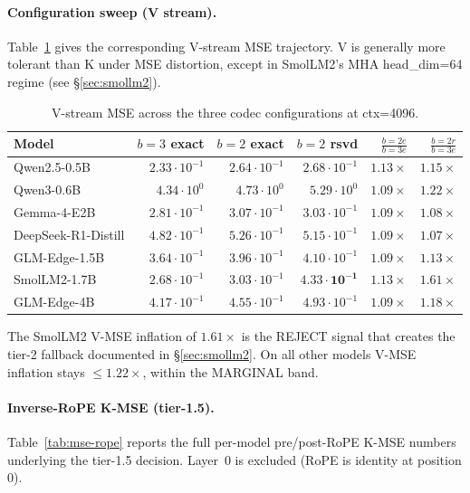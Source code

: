 \documentclass[11pt,a4paper]{article}
\theoremstyle{definition}
\theoremstyle{plain}
\begin{document}
\paragraph{Configuration sweep (V stream).}
Table~\ref{tab:mse-v-sweep} gives the corresponding V-stream MSE trajectory. V is generally more tolerant than K under MSE distortion, except in SmolLM2's MHA head\_dim=64 regime (see \S\ref{sec:smollm2}).

\begin{table}[H]
\centering
\small
\caption{V-stream MSE across the three codec configurations at ctx=4096.}
\label{tab:mse-v-sweep}
\begin{tabular}{lrrrrr}
  \toprule
  Model & $b=3$ exact & $b=2$ exact & $b=2$ rsvd & $\frac{b=2e}{b=3e}$ & $\frac{b=2r}{b=3e}$ \\
  \midrule
  Qwen2.5-0.5B                  & $2.33\!\cdot\!10^{-1}$ & $2.64\!\cdot\!10^{-1}$ & $2.68\!\cdot\!10^{-1}$ & $1.13\times$ & $1.15\times$ \\
  Qwen3-0.6B                    & $4.34\!\cdot\!10^{0}$  & $4.73\!\cdot\!10^{0}$  & $5.29\!\cdot\!10^{0}$  & $1.09\times$ & $1.22\times$ \\
  Gemma-4-E2B                   & $2.81\!\cdot\!10^{-1}$ & $3.07\!\cdot\!10^{-1}$ & $3.03\!\cdot\!10^{-1}$ & $1.09\times$ & $1.08\times$ \\
  DeepSeek-R1-Distill           & $4.82\!\cdot\!10^{-1}$ & $5.26\!\cdot\!10^{-1}$ & $5.15\!\cdot\!10^{-1}$ & $1.09\times$ & $1.07\times$ \\
  GLM-Edge-1.5B                 & $3.64\!\cdot\!10^{-1}$ & $3.96\!\cdot\!10^{-1}$ & $4.10\!\cdot\!10^{-1}$ & $1.09\times$ & $1.13\times$ \\
  SmolLM2-1.7B                  & $2.68\!\cdot\!10^{-1}$ & $3.03\!\cdot\!10^{-1}$ & $\mathbf{4.33\!\cdot\!10^{-1}}$ & $1.13\times$ & $\mathbf{1.61\times}$ \\
  GLM-Edge-4B                   & $4.17\!\cdot\!10^{-1}$ & $4.55\!\cdot\!10^{-1}$ & $4.93\!\cdot\!10^{-1}$ & $1.09\times$ & $1.18\times$ \\
  \bottomrule
\end{tabular}
\end{table}

The SmolLM2 V-MSE inflation of $1.61\times$ is the REJECT signal that creates the tier-2 fallback documented in \S\ref{sec:smollm2}. On all other models V-MSE inflation stays $\leq 1.22\times$, within the MARGINAL band.

\paragraph{Inverse-RoPE K-MSE (tier-1.5).}
Table~\ref{tab:mse-rope} reports the full per-model pre/post-RoPE K-MSE numbers underlying the tier-1.5 decision. Layer~0 is excluded (RoPE is identity at position $0$).
\end{document}
